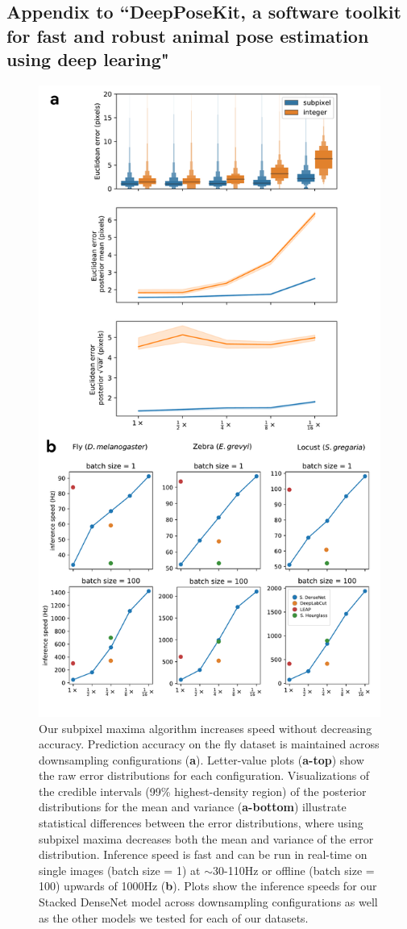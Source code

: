 \documentclass[11pt,a4paper,oneside]{book}
\begin{document}
\begin{doublespace}
\newpage

\begin{appendices}
\chapter[DeepPoseKit]{Appendix to ``DeepPoseKit, a software toolkit for fast and robust animal pose estimation using deep learing"}

    \label{app:figures}
    \begin{figure}[!htb]
    
    \centering
    \includegraphics[width=0.60\linewidth]{Graving_IMPRS_Thesis/figures/downsample_inference_speed.pdf}
    \caption{Our subpixel maxima algorithm increases speed without decreasing accuracy. Prediction accuracy on the fly dataset is maintained across downsampling configurations (\textbf{a}). Letter-value plots (\textbf{a-top}) show the raw error distributions for each configuration. Visualizations of the credible intervals (99\% highest-density region) of the posterior distributions for the mean and variance (\textbf{a-bottom}) illustrate statistical differences between the error distributions, where using subpixel maxima decreases both the mean and variance of the error distribution. Inference speed is fast and can be run in real-time on single images (batch size = 1) at $\sim$30-110Hz or offline (batch size = 100) upwards of 1000Hz (\textbf{b}). Plots show the inference speeds for our Stacked DenseNet model across downsampling configurations as well as the other models we tested for each of our datasets. }
    \label{fig:downsample_inference_speed}
    

\end{figure}
\end{appendices}
\end{doublespace}
\end{document}
